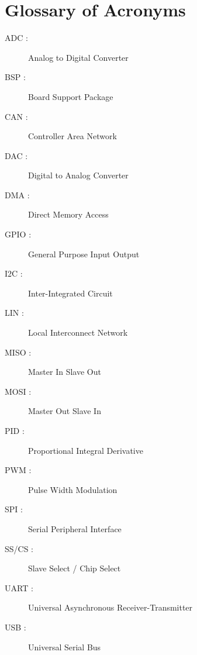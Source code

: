 \clearpage

\chapter*{Glossary of Acronyms}
\pagestyle{fancy}
\fancyhf{}
\cfoot{\thepage}
\vspace*{-2 cm}
\begin{description}
\item[ADC :]Analog to Digital Converter
\item[BSP :]Board Support Package
\item[CAN :]Controller Area Network
\item[DAC :]Digital to Analog Converter
\item[DMA :]Direct Memory Access
\item[GPIO :]General Purpose Input Output
\item[I2C :]Inter-Integrated Circuit
\item[LIN :]Local Interconnect Network
\item[MISO :]Master In Slave Out
\item[MOSI :]Master Out Slave In
\item[PID :]Proportional Integral Derivative
\item[PWM :]Pulse Width Modulation
\item[SPI :]Serial Peripheral Interface
\item[SS/CS :]Slave Select / Chip Select
\item[UART :]Universal Asynchronous Receiver-Transmitter
\item[USB :]Universal Serial Bus
\\
\end{description}